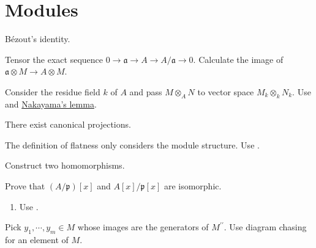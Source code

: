 \section{Modules}

\begin{exercise}\label{ex2.1}
	B\'{e}zout's identity.
\end{exercise}

\begin{exercise}\label{ex2.2}
	Tensor the exact sequence $0\rightarrow\mathfrak{a}\rightarrow A\rightarrow A/\mathfrak{a}\rightarrow0$. Calculate the image of  $\mathfrak{a}\otimes M\rightarrow A\otimes M$.
\end{exercise}

\begin{exercise}\label{ex2.3}
	Consider the residue field $k$ of $A$ and pass $M\otimes_AN$ to vector space $M_k\otimes_kN_k$. Use  and \hyperref[2.6]{Nakayama's lemma}.
\end{exercise}

\begin{exercise}\label{ex2.4}
	There exist canonical projections.
\end{exercise}

\begin{exercise}\label{ex2.5}
	The definition of flatness only considers the module structure. Use .
\end{exercise}

\begin{exercise}\label{ex2.6}
	Construct two homomorphisms.
\end{exercise}

\begin{exercise}\label{ex2.7}
	Prove that $(A/\mathfrak{p})[x]$ and $A[x]/\mathfrak{p}[x]$ are isomorphic.
\end{exercise}

\begin{exercise}\label{ex2.8}
	\begin{enumerate}
		\item[(ii)] Use .
	\end{enumerate}
\end{exercise}

\begin{exercise}\label{ex2.9}
	Pick $y_1,\cdots,y_m\in M$ whose images are the generators of $M^{\prime\prime}$. Use diagram chasing for an element of $M$. 
\end{exercise}

